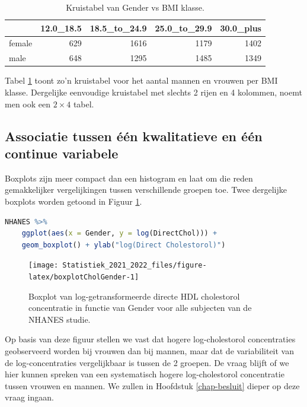 \documentclass[
  12pt,dutch,coursenotes]{book}
\theoremstyle{definition}
\theoremstyle{definition}
\theoremstyle{definition}
\theoremstyle{definition}
\theoremstyle{remark}
\begin{document}
\begin{table}

\caption{\label{tab:genderBMI}Kruistabel van Gender vs BMI klasse.}
\centering
\begin{tabular}[t]{lrrrr}
\toprule
  & 12.0\_18.5 & 18.5\_to\_24.9 & 25.0\_to\_29.9 & 30.0\_plus\\
\midrule
female & 629 & 1616 & 1179 & 1402\\
male & 648 & 1295 & 1485 & 1349\\
\bottomrule
\end{tabular}
\end{table}

Tabel \ref{tab:genderBMI} toont zo'n kruistabel voor het aantal mannen en vrouwen per BMI klasse. Dergelijke eenvoudige kruistabel met slechts 2 rijen en 4 kolommen, noemt men ook een \(2\times 4\) tabel.

\hypertarget{subsec:asskwalcont}{%
\subsection{Associatie tussen één kwalitatieve en één continue variabele}\label{subsec:asskwalcont}}

Boxplots zijn meer compact dan een histogram en laat om die reden gemakkelijker vergelijkingen tussen verschillende groepen toe. Twee dergelijke boxplots
worden getoond in Figuur \ref{fig:boxplotCholGender}.

\begin{lstlisting}[language=R]
NHANES %>%
    ggplot(aes(x = Gender, y = log(DirectChol))) +
    geom_boxplot() + ylab("log(Direct Cholestorol)")
\end{lstlisting}

\begin{figure}

{\centering \texttt{[image: Statistiek\_2021\_2022\_files/figure-latex/boxplotCholGender-1]} 

}

\caption{Boxplot van log-getransformeerde directe HDL cholestorol concentratie in functie van Gender voor alle subjecten van de NHANES studie.}\label{fig:boxplotCholGender}
\end{figure}

Op basis van deze figuur
stellen we vast dat hogere log-cholestorol concentraties
geobserveerd worden bij vrouwen dan bij mannen, maar dat de variabiliteit
van de log-concentraties vergelijkbaar is tussen de 2 groepen. De vraag blijft of we hier kunnen spreken van een systematisch hogere
log-cholestorol concentratie tussen vrouwen en mannen. We zullen in Hoofdstuk \ref{chap-besluit} dieper op deze vraag ingaan.
\end{document}
